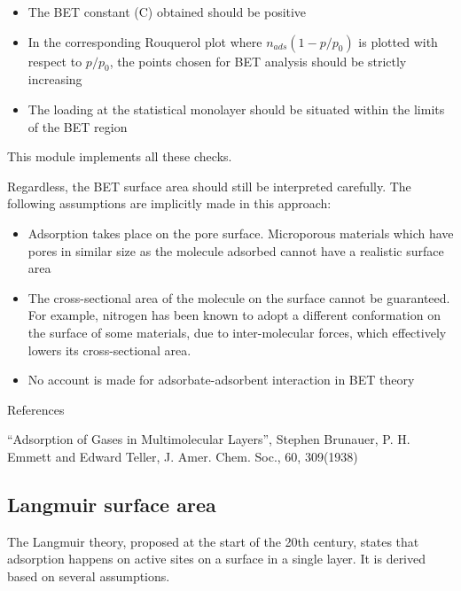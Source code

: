 \begin{itemize}

	\item The BET constant (C) obtained should be positive
	\item In the corresponding Rouquerol plot where \(n_{ads}(1-p/p_0)\) is plotted with respect to \(p/p_0\), the points chosen for BET
	      analysis should be strictly increasing
	\item  The loading at the statistical monolayer should be
	      situated within the limits of the BET region

\end{itemize}


This module implements all these checks.

Regardless, the BET surface area should still be interpreted carefully.
The following assumptions are implicitly made in this approach:

\begin{itemize}

    \item Adsorption takes place on the pore surface. Microporous materials
            which have pores in similar size as the molecule adsorbed
            cannot have a realistic surface area
    \item The cross-sectional area of the molecule on the surface
            cannot be guaranteed. For example, nitrogen has been known to adopt
            a different conformation on the surface of some materials,
            due to inter-molecular forces, which effectively
            lowers its cross-sectional area.
    \item No account is made for adsorbate-adsorbent interaction in BET theory

\end{itemize}

References

“Adsorption of Gases in Multimolecular Layers”, Stephen Brunauer,
P. H. Emmett and Edward Teller, J. Amer. Chem. Soc., 60, 309(1938)


\subsection{Langmuir surface area}

The Langmuir theory, proposed at the start of the 20th century,
states that adsorption happens on active sites on a surface
in a single layer. It is derived based on several assumptions.

